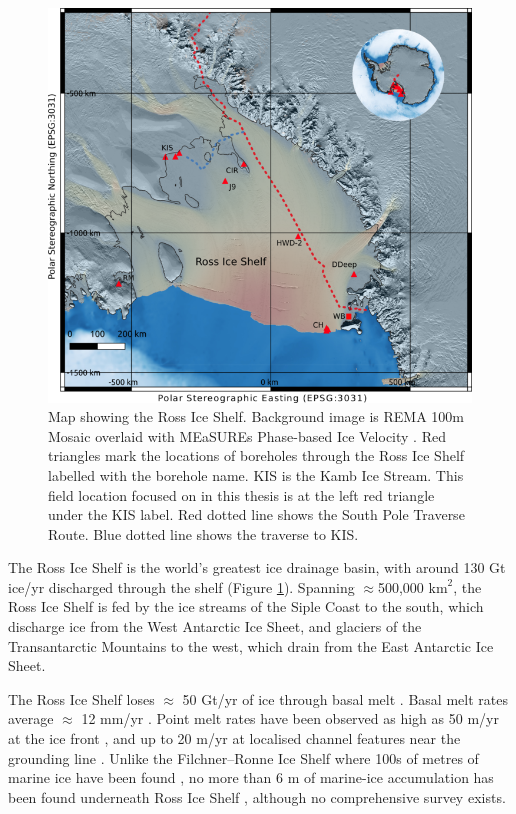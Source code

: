 \begin{figure}[!ht]
\centering
\includegraphics[width=1\textwidth]{chapters/1/ris.png}
\caption[Ross Ice Shelf Map]{Map showing the Ross Ice Shelf. Background image is REMA 100m Mosaic \citep{smith2009inventory}  overlaid with MEaSUREs Phase-based Ice Velocity \cite{mouginot2019continent}. Red triangles mark the locations of boreholes through the Ross Ice Shelf labelled with the borehole name. KIS is the Kamb Ice Stream. This field location focused on in this thesis is at the left red triangle under the KIS label. Red dotted line shows the South Pole Traverse Route. Blue dotted line shows the traverse to KIS.}
\label{fig:ris}
\end{figure}  

The Ross Ice Shelf is the world's greatest ice drainage basin, with around 130 Gt ice/yr discharged through the shelf \citep{rignot2008recent} (Figure \ref{fig:ris}). Spanning $\approx$500,000 $\mathrm{km}^2$, the Ross Ice Shelf is fed by the ice streams of the Siple Coast to the south, which discharge ice from the West Antarctic Ice Sheet, and glaciers of the Transantarctic Mountains to the west, which drain from the East Antarctic Ice Sheet. 

The Ross Ice Shelf loses $\approx$ 50 Gt/yr of ice through basal melt \citep{rignot2013ice,moholdt2014basal,das2020multidecadal}.  Basal melt rates  average $\approx$ 12 mm/yr \citep{moholdt2014basal}. Point melt rates have been observed as high as 50 m/yr at the ice front \citep{stewart2019basal}, and up to 20 m/yr at localised channel features near the grounding line \citep{marsh2016high}. Unlike the Filchner--Ronne Ice Shelf where 100s of metres of marine ice have been found \citep{craven2009properties}, no more than 6 m of marine-ice accumulation has been found underneath Ross Ice Shelf \citep{zotikov1980core}, although no comprehensive survey exists.

